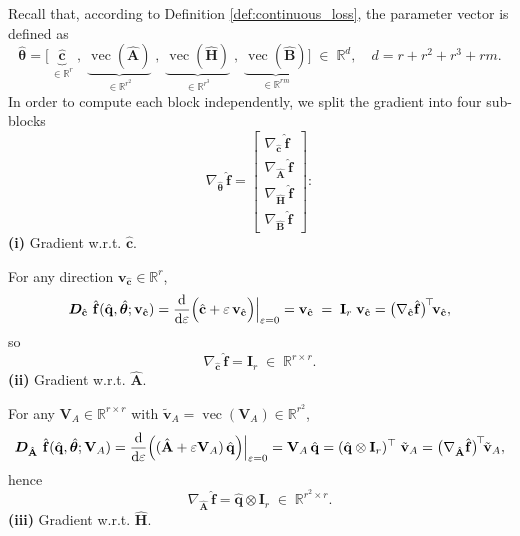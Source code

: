 Recall that, according to Definition \ref{def:continuous_loss}, the parameter vector is defined as\\
$$\hat{\bm{\theta}}=\bigl[\,\underbrace{\hat{\mathbf{c}}}_{\in\mathbb{R}^r}\;,\;\underbrace{\operatorname{vec}(\hat{\mathbf{A}})}_{\in\mathbb{R}^{r^2}}\;,\;\underbrace{\operatorname{vec}(\hat{\mathbf{H}})}_{\in\mathbb{R}^{r^3}}\;,\;\underbrace{\operatorname{vec}(\hat{\mathbf{B}})}_{\in\mathbb{R}^{rm}}\bigr]\;\in\; \mathbb{R}^d,\quad d = r + r^2 + r^3 + rm.$$
In order to compute each block independently, we split the gradient into four sub-blocks\\
$$\nabla_{\hat{\bm{\theta}}}\,\hat{\mathbf{f}} = \begin{bmatrix}
\nabla_{\hat{\mathbf{c}}}\,\hat{\mathbf{f}} \\
\nabla_{\hat{\mathbf{A}}}\,\hat{\mathbf{f}} \\
\nabla_{\hat{\mathbf{H}}}\,\hat{\mathbf{f}} \\
\nabla_{\hat{\mathbf{B}}}\,\hat{\mathbf{f}} 
\end{bmatrix}:$$
\noindent\textbf{(i)} Gradient w.r.t. $\hat{\mathbf{c}}$.

For any direction \(\mathbf{v}_{\hat{\mathbf{c}}}\in\mathbb{R}^r\),\\
$$\bm{D}_{\hat{\mathbf{c}}}~\hat{\mathbf{f}}(\hat{\mathbf{q}},\hat{\bm{\theta}};\mathbf{v}_{\hat{\mathbf{c}}}) = \dv{}{\varepsilon}\Bigl(\hat{\mathbf{c}}+\varepsilon\,\mathbf{v}_{\hat{\mathbf{c}}}\Bigr)\Big|_{\varepsilon=0} = \mathbf{v}_{\hat{\mathbf{c}}}\;=\;\mathbf{I}_r\;\mathbf{v}_{\hat{\mathbf{c}}} = \bigl(\nabla_{\hat{\mathbf{c}}}\hat{\mathbf{f}}\bigr)^{\!\top}\!\mathbf{v}_{\hat{\mathbf{c}}},$$
so\\
$$\nabla_{\hat{\mathbf{c}}}\,\hat{\mathbf{f}}=\mathbf{I}_r\;\in\;\mathbb{R}^{r\times r}.$$
\noindent\textbf{(ii)} Gradient w.r.t. $\hat{\mathbf{A}}$.

For any $\mathbf{V}_A\in\mathbb{R}^{r\times r}$ with $\tilde{\mathbf{v}}_A=\operatorname{vec}(\mathbf{V}_A)\in\mathbb{R}^{r^2}$,\\
$$\bm{D}_{\hat{\mathbf{A}}}~\hat{\mathbf{f}}(\hat{\mathbf{q}},\hat{\bm{\theta}};\mathbf{V}_A) = \dv{}{\varepsilon}\Bigl((\hat{\mathbf{A}}+\varepsilon\mathbf{V}_A)\,\hat{\mathbf{q}}\Bigr)\Big|_{\varepsilon=0}=\mathbf{V}_A\,\hat{\mathbf{q}}=(\hat{\mathbf{q}}\otimes\mathbf{I}_r)^{\top}\;\tilde{\mathbf{v}}_A=\bigl(\nabla_{\hat{\mathbf{A}}}\hat{\mathbf{f}}\bigr)^{\!\top}\!\tilde{\mathbf{v}}_A,$$
hence\\
$$\nabla_{\hat{\mathbf{A}}}\,\hat{\mathbf{f}}=\hat{\mathbf{q}}\otimes\mathbf{I}_r\;\in\;\mathbb{R}^{r^2\times r}.$$
\noindent\textbf{(iii)} Gradient w.r.t. $\hat{\mathbf{H}}$.

